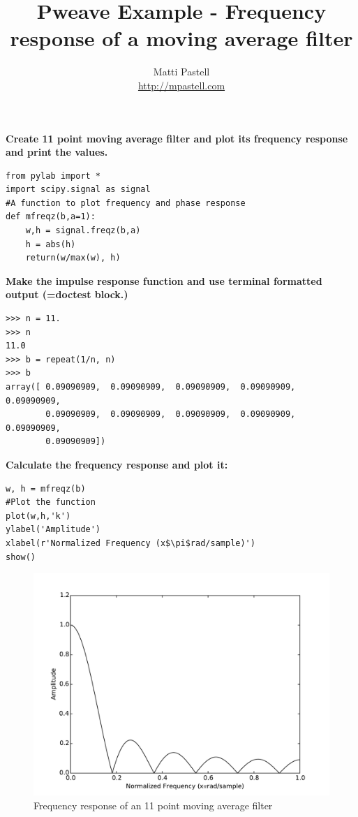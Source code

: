 \documentclass[a4paper,11pt,final]{article}
\begin{document}
\title{Pweave Example - Frequency response of a moving average filter}
\author{Matti Pastell \\
\url{http://mpastell.com}}

\maketitle

\textbf{Create 11 point moving average filter and plot its frequency response and print the values.}


\begin{verbatim}
from pylab import *
import scipy.signal as signal
#A function to plot frequency and phase response
def mfreqz(b,a=1):
    w,h = signal.freqz(b,a)
    h = abs(h)
    return(w/max(w), h)
\end{verbatim}


\textbf{Make the impulse response function and use terminal formatted output (=doctest block.)}


\begin{verbatim}
>>> n = 11.
>>> n
11.0
>>> b = repeat(1/n, n)
>>> b
array([ 0.09090909,  0.09090909,  0.09090909,  0.09090909,
0.09090909,
        0.09090909,  0.09090909,  0.09090909,  0.09090909,
0.09090909,
        0.09090909])

\end{verbatim}



\textbf{Calculate the frequency response and plot it:}


\begin{verbatim}
w, h = mfreqz(b)
#Plot the function
plot(w,h,'k')
ylabel('Amplitude')
xlabel(r'Normalized Frequency (x$\pi$rad/sample)')
show()
\end{verbatim}
\begin{figure}[htpb]
\center
\includegraphics[width= \linewidth]{figures/ma-tex_figure3_1.pdf}
\caption{Frequency response of an 11 point moving average filter}
\label{fig:None}
\end{figure}
\end{document}
